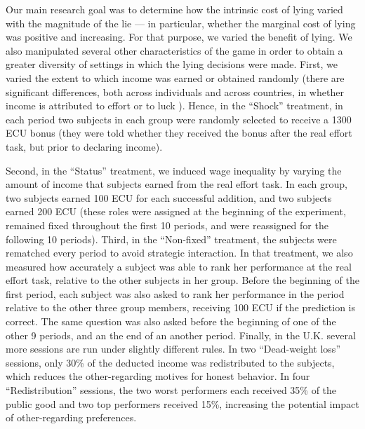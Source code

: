 \documentclass[12pt]{article}
\begin{document}
\par Our main research goal was to determine how the intrinsic cost of lying varied with the magnitude of the lie --- in particular, whether the marginal cost of lying was positive and increasing.  For that purpose, we varied the benefit of lying. We also manipulated several other characteristics of the game in order to obtain a greater diversity of settings in which the lying decisions were made. First, we varied the extent to which income was earned or obtained randomly (there are significant differences, both across individuals and across countries, in whether income is attributed to effort or to luck \citep{alesina2005fairness}). Hence, in the ``Shock'' treatment, in each period two subjects in each group were randomly selected to receive a 1300 ECU bonus (they were told whether they received the bonus after the real effort task, but prior to declaring income).\footnotemark{}

\par Second, in the ``Status'' treatment, we induced wage inequality by varying the amount of income that subjects earned from the real effort task. In each group, two subjects earned 100 ECU for each successful addition, and two subjects earned 200 ECU (these roles were  assigned at the beginning of the experiment, remained fixed throughout the first 10 periods, and were reassigned for the following 10 periods). Third, in the ``Non-fixed'' treatment, the subjects were rematched every period to avoid strategic interaction. In that treatment, we also measured how accurately a subject was able to rank her performance at the real effort task, relative to the other subjects in her group. Before the beginning of the first period, each subject was also asked to rank her performance in the period relative to the other three group members, receiving 100 ECU if the prediction is correct. The same question was also asked before the beginning of one of the other 9 periods, and an the end of an another period. Finally, in the U.K. several more sessions are run under slightly different rules. In two ``Dead-weight loss'' sessions, only 30\% of the deducted income was redistributed to the subjects, which reduces the other-regarding motives for honest behavior. In four ``Redistribution'' sessions, the two worst performers each received 35\% of the public good and two top performers received 15\%, increasing the potential impact of other-regarding preferences. \footnotemark{}
\end{document}
